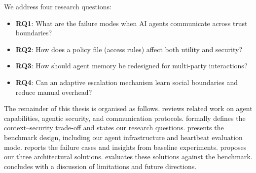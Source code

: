 We address four research questions:

\begin{itemize}
    \item \textbf{RQ1}: What are the failure modes when AI agents communicate across trust boundaries?
    \item \textbf{RQ2}: How does a policy file (access rules) affect both utility and security?
    \item \textbf{RQ3}: How should agent memory be redesigned for multi-party interactions?
    \item \textbf{RQ4}: Can an adaptive escalation mechanism learn social boundaries and reduce manual overhead?
\end{itemize}

The remainder of this thesis is organised as follows.  reviews related work on agent capabilities, agentic security, and communication protocols.  formally defines the context--security trade-off and states our research questions.  presents the benchmark design, including our agent infrastructure and heartbeat evaluation mode.  reports the failure cases and insights from baseline experiments.  proposes our three architectural solutions.  evaluates these solutions against the benchmark.  concludes with a discussion of limitations and future directions.
